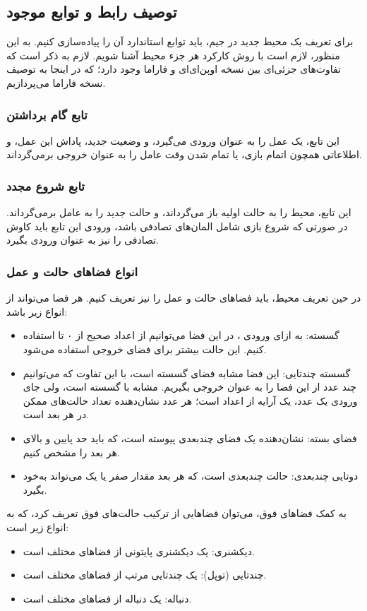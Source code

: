 \subsection{توصیف رابط و توابع موجود}
برای تعریف یک محیط جدید در جیم،
باید توابع استاندارد آن را پیاده‌سازی کنیم. به این منظور، لازم است با روش کارکرد هر جزء محیط آشنا شویم.
لازم به ذکر است که تفاوت‌های جزئی‌ای بین نسخه اوپن‌ای‌ای و فاراما وجود دارد؛ که در اینجا به توصیف نسخه فاراما می‌پردازیم.
\subsubsection{تابع گام برداشتن}
این تابع، یک عمل را به عنوان ورودی می‌گیرد،
و وضعیت جدید، پاداش این عمل، و اطلاعاتی همچون اتمام بازی، یا تمام شدن وقت عامل را به عنوان خروجی برمی‌گرداند.
\subsubsection{تابع شروع مجدد}
این تابع، محیط را به حالت اولیه باز می‌گرداند، و حالت جدید را به عامل برمی‌گرداند.
در صورتی که شروع بازی شامل المان‌های تصادفی باشد، ورودی این تابع باید کاوش تصادفی را نیز به عنوان ورودی بگیرد.
\subsubsection{انواع فضا‌های حالت و عمل}
در حین تعریف محیط، باید فضا‌های حالت و عمل را نیز تعریف کنیم.
هر فضا می‌تواند از انواع زیر باشد:
\begin{itemize}
    \item گسسته: به ازای ورودی ، در این فضا می‌توانیم از اعداد صحیح از ۰ تا  استفاده کنیم.
    این حالت بیشتر برای فضای خروجی استفاده می‌شود.
    \item گسسته چند‌تایی: این فضا مشابه فضای گسسته است، با این تفاوت که می‌توانیم چند عدد از این فضا را به عنوان خروجی بگیریم.
    مشابه با گسسته است، ولی جای ورودی یک عدد، یک آرایه از اعداد است؛ هر عدد نشان‌دهنده تعداد حالت‌های ممکن در هر بعد است.
    \item فضای بسته: نشان‌دهنده یک فضای چند‌بعدی پیوسته است، که باید حد پایین و بالای هر بعد را مشخص کنیم.
    \item دوتایی چند‌بعدی: حالت چند‌بعدی است، که هر بعد مقدار صفر یا یک می‌تواند به‌خود بگیرد.
\end{itemize}
به کمک فضا‌های فوق، می‌توان فضا‌هایی از ترکیب حالت‌های فوق تعریف کرد، که به انواع زیر است:
\begin{itemize}
    \item دیکشنری: یک دیکشنری پایتونی از فضا‌های مختلف است.
    \item چندتایی (توپل): یک چندتایی مرتب از فضا‌های مختلف است.
    \item دنباله: یک دنباله از فضا‌های مختلف است.
\end{itemize}

